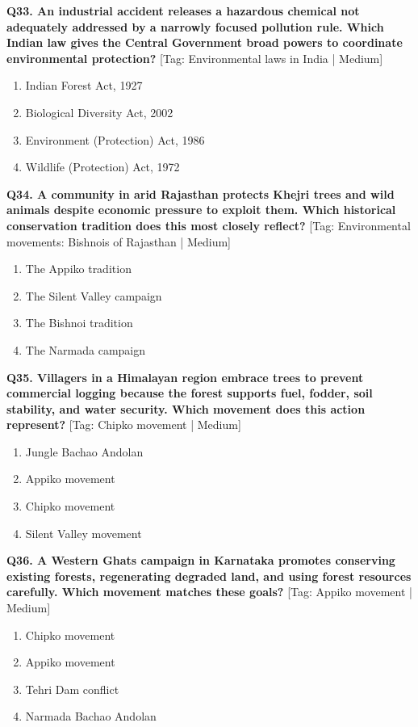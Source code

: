 \noindent\textbf{Q33. An industrial accident releases a hazardous chemical not adequately addressed by a narrowly focused pollution rule. Which Indian law gives the Central Government broad powers to coordinate environmental protection?} \hfill [Tag: Environmental laws in India | Medium]
\begin{enumerate}[label=(\alph*),topsep=2pt,itemsep=1pt,partopsep=0pt,parsep=0pt]
    \item {Indian Forest Act, 1927}
    \item {Biological Diversity Act, 2002}
    \item {Environment (Protection) Act, 1986}
    \item {Wildlife (Protection) Act, 1972}
\end{enumerate}
\vspace{2mm}

\noindent\textbf{Q34. A community in arid Rajasthan protects Khejri trees and wild animals despite economic pressure to exploit them. Which historical conservation tradition does this most closely reflect?} \hfill [Tag: Environmental movements: Bishnois of Rajasthan | Medium]
\begin{enumerate}[label=(\alph*),topsep=2pt,itemsep=1pt,partopsep=0pt,parsep=0pt]
    \item {The Appiko tradition}
    \item {The Silent Valley campaign}
    \item {The Bishnoi tradition}
    \item {The Narmada campaign}
\end{enumerate}
\vspace{2mm}

\noindent\textbf{Q35. Villagers in a Himalayan region embrace trees to prevent commercial logging because the forest supports fuel, fodder, soil stability, and water security. Which movement does this action represent?} \hfill [Tag: Chipko movement | Medium]
\begin{enumerate}[label=(\alph*),topsep=2pt,itemsep=1pt,partopsep=0pt,parsep=0pt]
    \item {Jungle Bachao Andolan}
    \item {Appiko movement}
    \item {Chipko movement}
    \item {Silent Valley movement}
\end{enumerate}
\vspace{2mm}

\noindent\textbf{Q36. A Western Ghats campaign in Karnataka promotes conserving existing forests, regenerating degraded land, and using forest resources carefully. Which movement matches these goals?} \hfill [Tag: Appiko movement | Medium]
\begin{enumerate}[label=(\alph*),topsep=2pt,itemsep=1pt,partopsep=0pt,parsep=0pt]
    \item {Chipko movement}
    \item {Appiko movement}
    \item {Tehri Dam conflict}
    \item {Narmada Bachao Andolan}
\end{enumerate}
\vspace{2mm}

